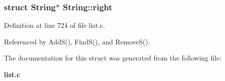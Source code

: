 \subsubsection{\setlength{\rightskip}{0pt plus 5cm}struct \bf{String}$\ast$ \bf{String::right}}\label{structString_9f2c0c858867cb592ce087a14cb64789}




Definition at line 724 of file list.c.

Referenced by Add\-S(), Find\-S(), and Remove\-S().

The documentation for this struct was generated from the following file:\begin{CompactItemize}
\item 
\bf{list.c}\end{CompactItemize}
